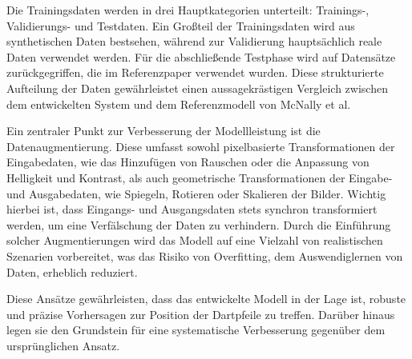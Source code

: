 Die Trainingsdaten werden in drei Hauptkategorien unterteilt: Trainings-, Validierungs- und Testdaten.
Ein Großteil der Trainingsdaten wird aus synthetischen Daten bestsehen, während zur Validierung hauptsächlich reale Daten verwendet werden. Für die abschließende Testphase wird auf Datensätze zurückgegriffen, die im Referenzpaper verwendet wurden. Diese strukturierte Aufteilung der Daten gewährleistet einen aussagekrästigen Vergleich zwischen dem entwickelten System und dem Referenzmodell von McNally et al.

Ein zentraler Punkt zur Verbesserung der Modellleistung ist die Datenaugmentierung. Diese umfasst sowohl pixelbasierte Transformationen der Eingabedaten, wie das Hinzufügen von Rauschen oder die Anpassung von Helligkeit und Kontrast, als auch geometrische Transformationen der Eingabe- und Ausgabedaten, wie Spiegeln, Rotieren oder Skalieren der Bilder. Wichtig hierbei ist, dass Eingangs- und Ausgangsdaten stets synchron transformiert werden, um eine Verfälschung der Daten zu verhindern. Durch die Einführung solcher Augmentierungen wird das Modell auf eine Vielzahl von realistischen Szenarien vorbereitet, was das Risiko von Overfitting, dem Auswendiglernen von Daten, erheblich reduziert.

Diese Ansätze gewährleisten, dass das entwickelte Modell in der Lage ist, robuste und präzise Vorhersagen zur Position der Dartpfeile zu treffen. Darüber hinaus legen sie den Grundstein für eine systematische Verbesserung gegenüber dem ursprünglichen Ansatz.

